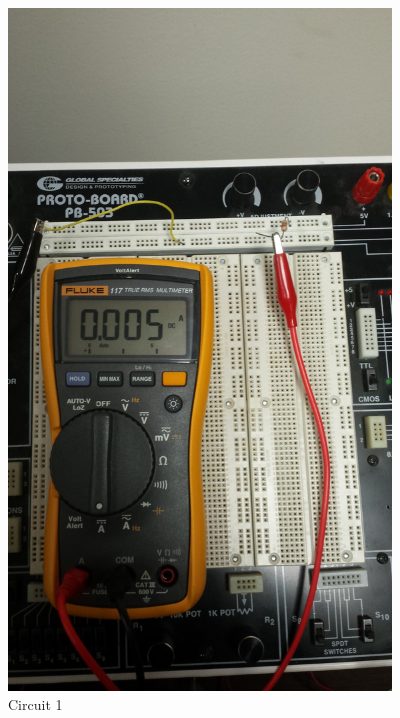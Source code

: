 \documentclass[12pt]{article}
\begin{document}
\begin{figure}[h!] %
   \centering
   \includegraphics[width=4in,angle=-90]{Circuit_1_real.jpg} 
   \caption{Circuit 1}
   \label{fig:example}
\end{figure}

\newpage
\end{document}

